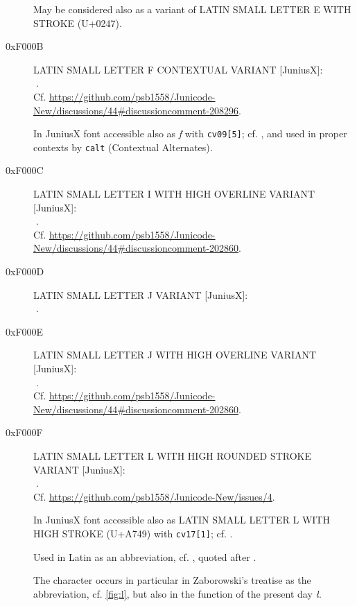 \documentclass{article}
\newcommand{\Jglyph}[1]{{\relsize{2}\J#1}}
\begin{document}
\begin{description}
 May be considered also as a variant of LATIN SMALL LETTER E WITH
  STROKE (U+0247).

\item [0xF000B] LATIN SMALL LETTER F CONTEXTUAL VARIANT [JuniusX]:\\
  \Jglyph{󰀋}.\\  Cf. \url{https://github.com/psb1558/Junicode-New/discussions/44#discussioncomment-208296}.
  
  In JuniusX font accessible also as \textit{f} with \texttt{cv09[5]};
  cf. \autocite[p. 9]{baker20:_opent_featur_junius_junius}, and used
  in proper contexts by \texttt{calt} (Contextual Alternates).
  
\item [0xF000C] LATIN SMALL LETTER I WITH HIGH OVERLINE VARIANT [JuniusX]:\\
  \Jglyph{󰀌}.\\ Cf. \url{https://github.com/psb1558/Junicode-New/discussions/44#discussioncomment-202860}.
\item [0xF000D] LATIN SMALL LETTER J VARIANT [JuniusX]:\\
  \Jglyph{󰀍}.\\ %

\item [0xF000E] LATIN SMALL LETTER J WITH HIGH OVERLINE  VARIANT [JuniusX]:\\
  \Jglyph{󰀎}.\\ Cf. \url{https://github.com/psb1558/Junicode-New/discussions/44#discussioncomment-202860}.
\item [0xF000F] LATIN SMALL LETTER L WITH HIGH ROUNDED STROKE VARIANT [JuniusX]:\\
  \Jglyph{󰀏}.\\  Cf. \url{https://github.com/psb1558/Junicode-New/issues/4}.

  In JuniusX font accessible also as
  LATIN SMALL LETTER L WITH HIGH STROKE
  (U+A749) with \texttt{cv17[1]};
  cf. \autocite[p. 9]{baker20:_opent_featur_junius_junius}.

  Used in Latin as an abbreviation, cf. \autocite{balbi1460:_cathol},
  quoted after \autocite[s. 6]{N3027}. 
  
  The character occurs in particular in Zaborowski's treatise as the
  abbreviation, cf. \vref{fig:l}, but also in the function of the
  present day \textit{ł}.


\end{description}
\end{document}
